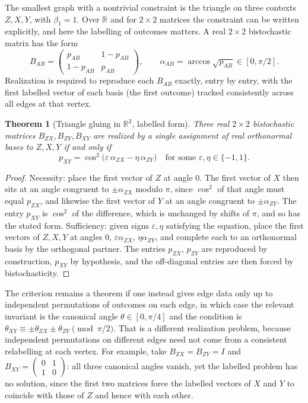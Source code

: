 \documentclass[11pt,oneside]{book}
\newtheorem{theorem}{Theorem}[chapter]
\theoremstyle{definition}
\theoremstyle{remark}
\begin{document}
The smallest graph with a nontrivial constraint is the triangle on three contexts $Z,X,Y$, with $\beta_1=1$. Over $\mathbb R$ and for $2\times2$ matrices the constraint can be written explicitly, and here the labelling of outcomes matters. A real $2\times2$ bistochastic matrix has the form
\[
B_{AB}=\begin{pmatrix}p_{AB}&1-p_{AB}\\1-p_{AB}&p_{AB}\end{pmatrix},\qquad \alpha_{AB}=\arccos\sqrt{p_{AB}}\in[0,\pi/2].
\]
Realization is required to reproduce each $B_{AB}$ exactly, entry by entry, with the first labelled vector of each basis (the first outcome) tracked consistently across all edges at that vertex.

\begin{theorem}[Triangle gluing in $\mathbb R^2$, labelled form]\label{thm:triangle}
Three real $2\times2$ bistochastic matrices $B_{ZX},B_{ZY},B_{XY}$ are realized by a single assignment of real orthonormal bases to $Z,X,Y$ if and only if
\[
p_{XY}=\cos^2\!\bigl(\varepsilon\,\alpha_{ZX}-\eta\,\alpha_{ZY}\bigr)\quad\text{for some }\varepsilon,\eta\in\{-1,1\}.
\]
\end{theorem}

\begin{proof}
Necessity: place the first vector of $Z$ at angle $0$. The first vector of $X$ then sits at an angle congruent to $\pm\alpha_{ZX}$ modulo $\pi$, since $\cos^2$ of that angle must equal $p_{ZX}$, and likewise the first vector of $Y$ at an angle congruent to $\pm\alpha_{ZY}$. The entry $p_{XY}$ is $\cos^2$ of the difference, which is unchanged by shifts of $\pi$, and so has the stated form. Sufficiency: given signs $\varepsilon,\eta$ satisfying the equation, place the first vectors of $Z,X,Y$ at angles $0$, $\varepsilon\alpha_{ZX}$, $\eta\alpha_{ZY}$, and complete each to an orthonormal basis by the orthogonal partner. The entries $p_{ZX}$, $p_{ZY}$ are reproduced by construction, $p_{XY}$ by hypothesis, and the off-diagonal entries are then forced by bistochasticity.
\end{proof}

The criterion remains a theorem if one instead gives edge data only up to independent permutations of outcomes on each edge, in which case the relevant invariant is the canonical angle $\theta\in[0,\pi/4]$ and the condition is $\theta_{XY}\equiv\pm\theta_{ZX}\pm\theta_{ZY}\pmod{\pi/2}$. That is a different realization problem, because independent permutations on different edges need not come from a consistent relabelling at each vertex. For example, take $B_{ZX}=B_{ZY}=I$ and $B_{XY}=\begin{pmatrix}0&1\\1&0\end{pmatrix}$: all three canonical angles vanish, yet the labelled problem has no solution, since the first two matrices force the labelled vectors of $X$ and $Y$ to coincide with those of $Z$ and hence with each other.
\end{document}
